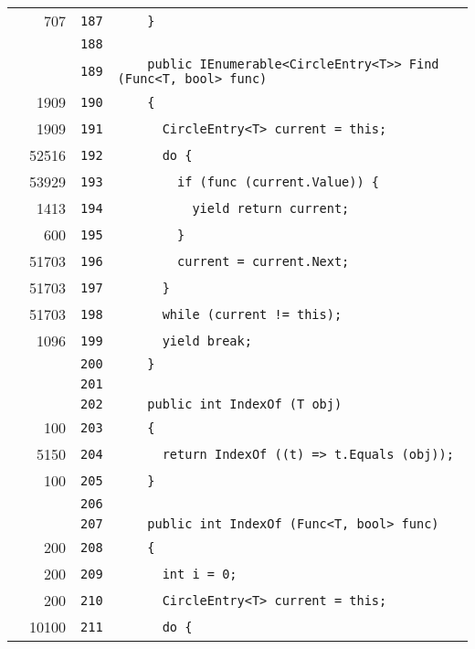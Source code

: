 \documentclass[a4paper,10pt]{article}
\begin{document}
\begin{longtable}[l]{lrrl}
\cellcolor{green} & 707 & \verb~187~ & \verb~    }~\\
\cellcolor{gray} &  & \verb~188~ & \verb~~\\
\cellcolor{gray} &  & \verb~189~ & \verb~    public IEnumerable<CircleEntry<T>> Find (Func<T, bool> func)~\\
\cellcolor{green} & 1909 & \verb~190~ & \verb~    {~\\
\cellcolor{green} & 1909 & \verb~191~ & \verb~      CircleEntry<T> current = this;~\\
\cellcolor{green} & 52516 & \verb~192~ & \verb~      do {~\\
\cellcolor{green} & 53929 & \verb~193~ & \verb~        if (func (current.Value)) {~\\
\cellcolor{green} & 1413 & \verb~194~ & \verb~          yield return current;~\\
\cellcolor{green} & 600 & \verb~195~ & \verb~        }~\\
\cellcolor{green} & 51703 & \verb~196~ & \verb~        current = current.Next;~\\
\cellcolor{green} & 51703 & \verb~197~ & \verb~      }~\\
\cellcolor{green} & 51703 & \verb~198~ & \verb~      while (current != this);~\\
\cellcolor{green} & 1096 & \verb~199~ & \verb~      yield break;~\\
\cellcolor{gray} &  & \verb~200~ & \verb~    }~\\
\cellcolor{gray} &  & \verb~201~ & \verb~~\\
\cellcolor{gray} &  & \verb~202~ & \verb~    public int IndexOf (T obj)~\\
\cellcolor{green} & 100 & \verb~203~ & \verb~    {~\\
\cellcolor{green} & 5150 & \verb~204~ & \verb~      return IndexOf ((t) => t.Equals (obj));~\\
\cellcolor{green} & 100 & \verb~205~ & \verb~    }~\\
\cellcolor{gray} &  & \verb~206~ & \verb~~\\
\cellcolor{gray} &  & \verb~207~ & \verb~    public int IndexOf (Func<T, bool> func)~\\
\cellcolor{green} & 200 & \verb~208~ & \verb~    {~\\
\cellcolor{green} & 200 & \verb~209~ & \verb~      int i = 0;~\\
\cellcolor{green} & 200 & \verb~210~ & \verb~      CircleEntry<T> current = this;~\\
\cellcolor{green} & 10100 & \verb~211~ & \verb~      do {~\\

\end{longtable}
\end{document}
